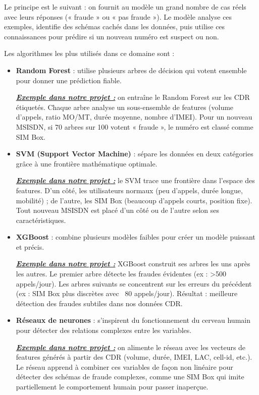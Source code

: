 \documentclass[12pt, oneside, a4paper]{report}
\begin{document}
Le principe est le suivant : on fournit au modèle un grand nombre de cas réels avec leurs réponses (« fraude » ou « pas fraude »). Le modèle analyse ces exemples, identifie des schémas cachés dans les données, puis utilise ces connaissances pour prédire si un nouveau numéro est suspect ou non.

Les algorithmes les plus utilisés dans ce domaine sont :
\begin{itemize}
\item \textbf{Random Forest} : utilise plusieurs arbres de décision qui votent ensemble pour donner une prédiction fiable.

 \underline{\textit{\textbf{Exemple dans notre projet :}}} on entraîne le Random Forest sur les CDR étiquetés. Chaque arbre analyse un sous-ensemble de features (volume d'appels, ratio MO/MT, durée moyenne, nombre d'IMEI). Pour un nouveau MSISDN, si 70 arbres sur 100 votent « fraude », le numéro est classé comme SIM Box.
\vspace{0.5cm}
 
\item \textbf{SVM (Support Vector Machine)} : sépare les données en deux catégories grâce à une frontière mathématique optimale.

\underline{\textit{\textbf{Exemple dans notre projet :}}} le SVM trace une frontière dans l'espace des features. D'un côté, les utilisateurs normaux (peu d'appels, durée longue, mobilité) ; de l'autre, les SIM Box (beaucoup d'appels courts, position fixe). Tout nouveau MSISDN est placé d'un côté ou de l'autre selon ses caractéristiques.

 \vspace{0.5cm}
\item \textbf{XGBoost} : combine plusieurs modèles faibles pour créer un modèle puissant et précis.

\underline{\textit{\textbf{Exemple dans notre projet :}}} XGBoost construit ses arbres les uns après les autres. Le premier arbre détecte les fraudes évidentes (ex : >500 appels/jour). Les arbres suivants se concentrent sur les erreurs du précédent (ex : SIM Box plus discrètes avec ~80 appels/jour). Résultat : meilleure détection des fraudes subtiles dans nos données CDR.
 \vspace{0.5cm}
 
\item \textbf{Réseaux de neurones} : s'inspirent du fonctionnement du cerveau humain pour détecter des relations complexes entre les variables.

\underline{\textit{\textbf{Exemple dans notre projet :}}} on alimente le réseau avec les vecteurs de features générés à partir des CDR (volume, durée, IMEI, LAC, cell-id, etc.). Le réseau apprend à combiner ces variables de façon non linéaire pour détecter des schémas de fraude complexes, comme une SIM Box qui imite partiellement le comportement humain pour passer inaperçue.
\end{itemize}
\end{document}
